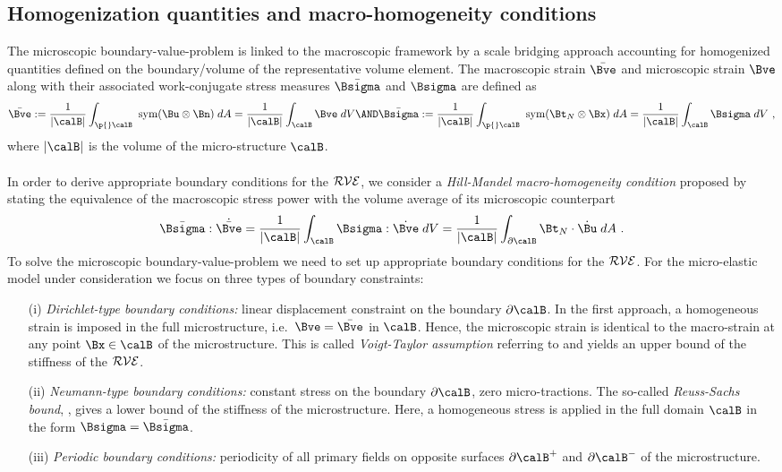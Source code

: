 \documentclass[final,3p,times]{elsarticle}
\begin{document}
\subsection{Homogenization quantities and macro-homogeneity conditions}

The microscopic boundary-value-problem is linked to the macroscopic framework by a scale bridging approach accounting for homogenized quantities defined on the boundary/volume of the representative volume element. The macroscopic strain $\bar\Bve$ and microscopic strain $\Bve$ along with their associated work-conjugate stress measures $\bar\Bsigma$ and $\Bsigma$ are defined as
%
\begin{equation}
\bar\Bve:=\frac{1}{|\calB|} \int_{\p{}\calB} \ \mbox{sym} (\Bu \otimes \Bn)\; dA = 
\frac{1}{|\calB|} \int_{\calB} \Bve \;dV 
\AND 
\bar\Bsigma:=\frac{1}{|\calB|} \int_{\p{}\calB} \ \mbox{sym} (\Bt_N \otimes \Bx)\; dA
=  \frac{1}{|\calB|} \int_{\calB} \Bsigma \; dV
\ ,
\label{eq:homo7}
\end{equation}
% 
where $|\calB|$ is the volume of the micro-structure $\calB$.
\\
\\
In order to derive appropriate boundary conditions for the $\cal{RVE}$, we consider a \textit{ Hill-Mandel macro-homogeneity condition} proposed
by \citet{hill72} stating the equivalence of the macroscopic stress power with the volume average of its microscopic counterpart
%
\begin{equation}
\bar\Bsigma:\dot{\bar\Bve}	= \frac{1}{|\calB|} \int_{\calB} \Bsigma : \dot\Bve \; dV = \frac{1}{|\calB|} \int_{\partial\calB} \Bt_N \cdot\dot\Bu \; dA 
\ .
\label{eq:homo8}
\end{equation}
%
To solve the microscopic boundary-value-problem we need to set up appropriate boundary conditions for the $\cal{RVE}$. For the micro-elastic model under consideration we focus on three types of boundary constraints:
%
\begin{itemize}
	\item[(i)] \textit{Dirichlet-type boundary conditions:} linear displacement constraint on the boundary $\partial\calB$. In the first approach, a homogeneous strain is imposed in the full microstructure, i.e.\
	$\Bve=\bar\Bve$ in $\calB$. Hence, the microscopic strain is identical
	to the macro-strain at any point $\Bx\in\calB$ of the
	microstructure. This is called \textit{Voigt-Taylor assumption}
	referring to \citet{voigt1887} and
	yields an upper bound of the stiffness of the $\cal{RVE}$.
	\item[(ii)] \textit{Neumann-type boundary conditions:} constant stress on the boundary $\partial\calB$, zero micro-tractions. The so-called \textit{Reuss-Sachs bound}, \citet{reuss29}, gives a lower bound of the stiffness of the microstructure. Here, a homogeneous stress is applied in the full domain $\calB$ in the form $\Bsigma=\bar\Bsigma$.
	\item[(iii)] \textit{Periodic boundary conditions:} periodicity of all primary
	fields on opposite surfaces $\partial\calB^+$ and
	$\partial\calB^-$ of the microstructure.
\end{itemize}
\end{document}
